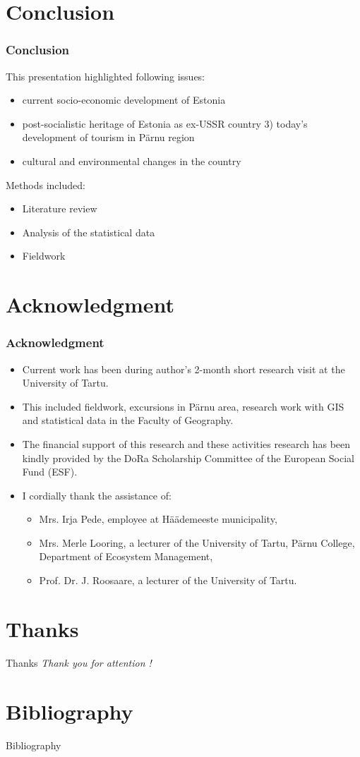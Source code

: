\documentclass[pdflatex,compress,8pt,
	xcolor={dvipsnames,dvipsnames,svgnames,x11names,table},
]{beamer}
\begin{document}
\section{Conclusion}
\begin{frame}\frametitle{Conclusion}
This presentation highlighted following issues:
\begin{itemize}
	\item current socio-economic development of Estonia
	\item post-socialistic heritage of Estonia as ex-USSR country 3) today's development of tourism in Pärnu region
	\item cultural and environmental changes in the country
\end{itemize}
Methods included:
\begin{itemize}
	\item Literature review
	\item Analysis of the statistical data
	\item Fieldwork
\end{itemize}
\end{frame}

\section{Acknowledgment}
\begin{frame}\frametitle{Acknowledgment}
\begin{itemize}
	\item Current work has been during author's 2-month short research visit at the University of Tartu.
	\item This included fieldwork, excursions in Pärnu area, research work with GIS and statistical data in the Faculty of Geography.
	\item The financial support of this research and these activities research has been kindly provided by the DoRa Scholarship Committee of the European Social Fund (ESF).
	\item I cordially thank the assistance of: 
	\begin{itemize}
		\item Mrs. Irja Pede, employee at Häädemeeste municipality,
		\item Mrs. Merle Looring, a lecturer of the University of Tartu, Pärnu College, \\
		Department of Ecosystem Management, 
		\item Prof. Dr. J. Roosaare, a lecturer of the University of Tartu.
	\end{itemize}
\end{itemize}
\end{frame}

\section{Thanks}
\begin{frame}{Thanks}
  	\centering \LARGE 
  	\emph{Thank you for attention !}\\
\end{frame}


\section{Bibliography}
\Large{Bibliography}
\vspace{1em}
\nocite{*}
\printbibliography[heading=none]
\end{document}
